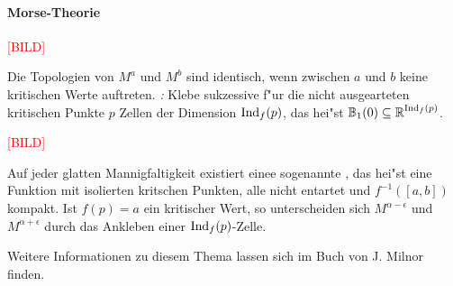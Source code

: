 \paragraph{Morse-Theorie}
\begin{center}\textcolor{red}{[BILD]}\end{center}
Die Topologien von $M^a$  und $M^b$ sind identisch, wenn zwischen $a$ und $b$ keine kritischen Werte auftreten.
\emph{:} Klebe sukzessive f"ur die nicht ausgearteten kritischen Punkte $p$ Zellen der Dimension $\operatorname{Ind}_f(p)$, das hei"st $\operatorname{\mathbb{B}}_1(0) \subseteq \operatorname{\mathbb{R}}^{\operatorname{Ind}_f(p)}$.
\begin{center}\textcolor{red}{[BILD]}\end{center}
Auf jeder glatten Mannigfaltigkeit existiert einee sogenannte , das hei"st eine Funktion mit isolierten kritschen Punkten, alle nicht entartet und $f^{-1}([a,b])$ kompakt. Ist $f(p) = a$ ein kritischer Wert, so unterscheiden sich $M^{\alpha - \epsilon}$ und $M^{\alpha + \epsilon}$ durch das Ankleben einer $\operatorname{Ind}_f(p)$-Zelle.

Weitere Informationen zu diesem Thema lassen sich im Buch  von J. Milnor \cite{milnor1963morsetheo} finden.

